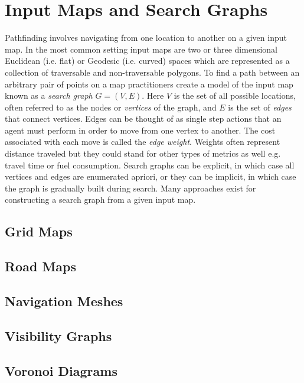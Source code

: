 \section{Input Maps and Search Graphs}
Pathfinding involves navigating from one location to another on a given input
map. In the most common setting input maps are two or three dimensional
Euclidean (i.e. flat) or Geodesic (i.e. curved) spaces which are represented as
a collection of traversable and non-traversable polygons.
To find a path between an arbitrary pair of points on a map practitioners 
create a model of the input map known as a \emph{search graph} $G = (V, E)$. 
Here $V$ is the set of all possible locations, often referred to as the nodes or
\emph{vertices} of the graph, and $E$ is the set of \emph{edges} that connect
vertices.  Edges can be thought of as single step actions that an agent
must perform in order to move from one vertex to another.
The cost associated with each move is called the \emph{edge weight}.
Weights often represent distance traveled but they could stand for other
types of metrics as well e.g. travel time or fuel consumption.
Search graphs can be explicit, in which case all vertices and edges
are enumerated apriori, or they can be implicit, in which case the graph is 
gradually built during search.
Many approaches exist for constructing a search graph from a given input map.

%

\subsection{Grid Maps}

\subsection{Road Maps}

\subsection{Navigation Meshes}

\subsection{Visibility Graphs}

\subsection{Voronoi Diagrams}

